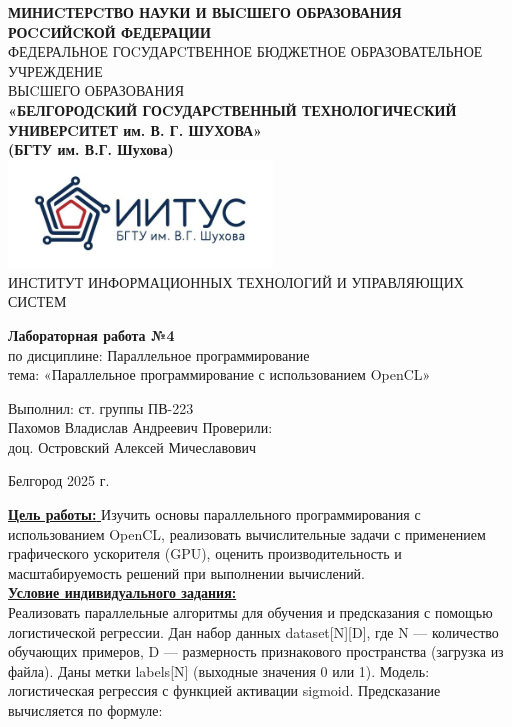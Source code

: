 \documentclass[a4paper,14pt]{extarticle}
\newcommand\textbox[1]{
	\parbox{.45\textwidth}{#1}
}
\begin{document}
\begin{center}
    \small{
        \textbf{МИНИCТЕРCТВО НАУКИ И ВЫCШЕГО ОБРАЗОВАНИЯ РОCCИЙCКОЙ ФЕДЕРАЦИИ}\\
        ФЕДЕРАЛЬНОЕ ГОCУДАРCТВЕННОЕ БЮДЖЕТНОЕ ОБРАЗОВАТЕЛЬНОЕ УЧРЕЖДЕНИЕ\\ВЫCШЕГО ОБРАЗОВАНИЯ \\
        \textbf{«БЕЛГОРОДCКИЙ ГОCУДАРCТВЕННЫЙ ТЕХНОЛОГИЧЕCКИЙ\\УНИВЕРCИТЕТ им. В. Г. ШУХОВА»\\ (БГТУ им. В.Г. Шухова)} \\
        \bigbreak
        \includegraphics[width=70mm]{log}\\
        ИНСТИТУТ ИНФОРМАЦИОННЫХ ТЕХНОЛОГИЙ И УПРАВЛЯЮЩИХ СИСТЕМ\\}
\end{center}

\vfill
\begin{center}
    \large{
        \textbf{
            Лабораторная работа №4}}\\
    \normalsize{
        по дисциплине: Параллельное программирование \\
        тема: «Параллельное программирование с использованием OpenCL»}
\end{center}
\vfill
\hfill\textbox{
    Выполнил: ст. группы ПВ-223\\Пахомов Владислав Андреевич
    \bigbreak
    Проверили: \\доц. Островский Алексей Мичеславович
}
\vfill\begin{center}
    Белгород 2025 г.
\end{center}
\newpage
\underline{\textbf{Цель работы: }}Изучить основы параллельного программирования с использованием OpenCL,
реализовать вычислительные задачи с применением графического ускорителя (GPU), оценить
производительность и масштабируемость решений при выполнении вычислений.\\
\underline{\textbf{Условие индивидуального задания: }}\\
Реализовать параллельные алгоритмы для обучения и предсказания с помощью
логистической регрессии. Дан набор данных dataset[N][D], где N — количество обучающих
примеров, D — размерность признакового пространства (загрузка из файла). Даны метки
labels[N] (выходные значения 0 или 1). Модель: логистическая регрессия с функцией
активации sigmoid. Предсказание вычисляется по формуле:\\
\end{document}
